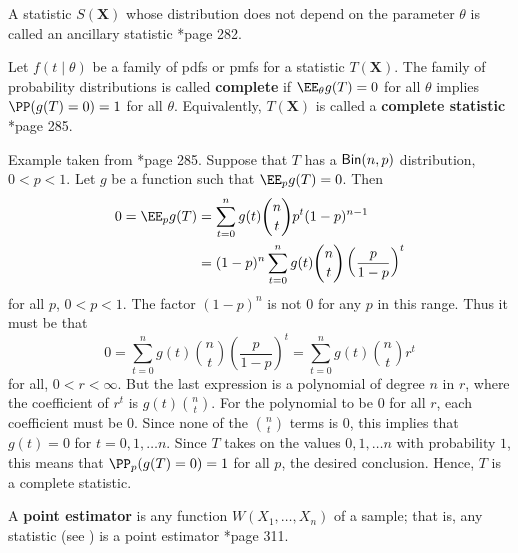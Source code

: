 \begin{defe} \label{defe: ancillary_statistic}
    A statistic $S(\bm{X})$ whose distribution does not depend on the parameter $\theta$ is called an ancillary statistic \cite{CasellaGeorge2001SI}*{page 282}.
\end{defe}

\begin{defe} \label{defe: complete_statistic}
    Let $f(t \mid \theta)$ be a family of pdfs or pmfs for a statistic $T(\bm{X})$. The family of probability distributions is called {\bf complete} if $\EE_{\theta} g(T) = 0$ for all $\theta$ implies $\PP (g(T) = 0) = 1$ for all $\theta$. Equivalently, $T(\bm{X})$ is called a {\bf complete statistic} \cite{CasellaGeorge2001SI}*{page 285}.
\end{defe}

\begin{exam} \label{exam: bin_comp_stat}
    Example taken from \cite{CasellaGeorge2001SI}*{page 285}. Suppose that $T$ has a ${\sf Bin} (n,p)$ distribution, $0<p<1$. Let $g$ be a function such that $\EE_{p} g(T) = 0$. Then
    \begin{align*}
        0 = \EE_{p} g(T) & = \sum_{t=0}^{n} g(t) \binom{n}{t} p^{t} (1-p)^{n-1}                        \\
                         & = (1-p)^n \sum_{t=0}^{n} g(t) \binom{n}{t} \left( \frac{p}{1-p} \right)^{t}
    \end{align*}
    for all $p$, $0<p<1$. The factor $(1-p)^n$ is not 0 for any $p$ in this range. Thus it must be that
    \begin{equation*}
        0 = \sum_{t=0}^{n} g(t) \binom{n}{t} \left( \frac{p}{1-p} \right)^{t} = \sum_{t=0}^{n} g(t) \binom{n}{t} r^t
    \end{equation*}
    for all, $0 < r < \infty$. But the last expression is a polynomial of degree $n$ in $r$, where the coefficient of $r^t$ is $g(t) \binom{n}{t}$. For the polynomial to be $0$ for all $r$, each coefficient must be $0$. Since none of the $\binom{n}{t}$ terms is $0$, this implies that $g(t) = 0$ for $t=0,1,\ldots n$. Since $T$ takes on the values $0,1,\ldots n$ with probability $1$, this means that $\PP_p (g(T) = 0) = 1$ for all $p$, the desired conclusion. Hence, $T$ is a complete statistic.
\end{exam}

\begin{defe} \label{defe: point_estimator}
    A {\bf point estimator} is any function $W(X_1 , \ldots , X_n)$ of a sample; that is, any statistic (see ) is a point estimator \cite{CasellaGeorge2001SI}*{page 311}.
\end{defe}